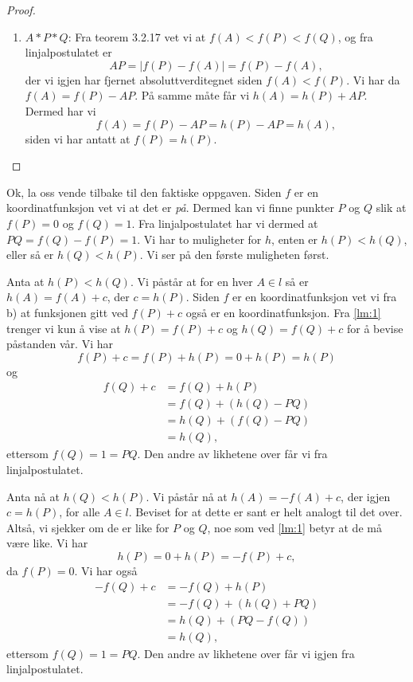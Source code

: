 \begin{oppgave}[3.2.12]
\begin{punkt}
\begin{proof}
\begin{enumerate}
        \item $A\ast P\ast Q$: Fra teorem 3.2.17 vet vi at $f(A)<f(P)<f(Q)$, og fra 
        linjalpostulatet er $$ AP = |f(P)-f(A)| = f(P)-f(A), $$ der vi igjen har fjernet 
        absoluttverditegnet siden $f(A)<f(P)$. Vi har da $f(A)=f(P)-AP$. På samme måte får 
        vi $h(A)=h(P)+AP$. Dermed har vi $$ f(A)=f(P)-AP = h(P)-AP = h(A), $$ siden vi har 
        antatt at $f(P)=h(P)$. 
      \end{enumerate}
    \end{proof}
    

    Ok, la oss vende tilbake til den faktiske oppgaven. Siden $f$ er en koordinatfunksjon vet 
    vi at det er \emph{på}. Dermed kan vi finne punkter $P$ og $Q$ slik at $f(P)=0$ og $f(Q)=1$.
    Fra linjalpostulatet har vi dermed at $PQ=f(Q)-f(P)=1$. Vi har to muligheter for $h$, enten 
    er $h(P)<h(Q)$, eller så er $h(Q)<h(P)$. Vi ser på den første muligheten først. 

    Anta at $h(P)< h(Q)$. Vi påstår at for en hver $A\in l$ så er $h(A)=f(A)+c$, der $c=h(P)$. Siden 
    $f$ er en koordinatfunksjon vet vi fra b) at funksjonen gitt ved $f(P)+c$ også er en 
    koordinatfunksjon. Fra \cref{lm:1} trenger vi kun å vise at $h(P)=f(P)+c$ og $h(Q)=f(Q)+c$ for 
    å bevise påstanden vår. Vi har $$f(P)+c = f(P)+h(P) = 0+ h(P) = h(P)$$ og 
    \begin{align*}
        f(Q)+c 
        &= f(Q)+h(P) \\
        &= f(Q)+(h(Q)-PQ) \\
        &= h(Q) + (f(Q)-PQ) \\
        &= h(Q),
    \end{align*}
    ettersom $f(Q) = 1 = PQ$. Den andre av likhetene over får vi fra linjalpostulatet. 

    Anta nå at $h(Q)<h(P)$. Vi påstår nå at $h(A)=-f(A)+c$, der igjen $c=h(P)$, for alle $A\in l$.
    Beviset for at dette er sant er helt analogt til det over. Altså, vi sjekker om de er like for 
    $P$ og $Q$, noe som ved \cref{lm:1} betyr at de må være like. Vi har 
    $$h(P)=0+h(P)=-f(P)+c,$$ da $f(P)=0$. Vi har også 
    \begin{align*}
        -f(Q)+c 
        &= -f(Q)+h(P) \\
        &= -f(Q)+(h(Q)+PQ) \\
        &= h(Q) + (PQ-f(Q)) \\
        &= h(Q),
    \end{align*}
    ettersom $f(Q) = 1 = PQ$. Den andre av likhetene over får vi igjen fra linjalpostulatet. 
  \end{punkt}
\end{oppgave}


